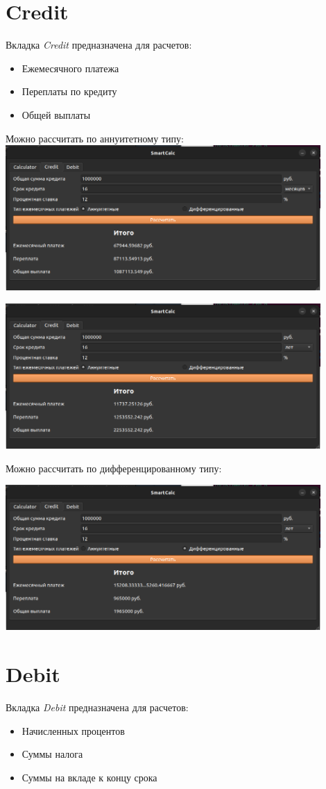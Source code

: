 \documentclass[12pt, letterpaper, twoside]{article}
\begin{document}
	\section{Credit}
	\begin{center}
		Вкладка \textit{Credit} предназначена для расчетов:
		\begin{itemize}
			\item Ежемесячного платежа
			\item Переплаты по кредиту
			\item Общей выплаты
		\end{itemize}
		
		\par Можно рассчитать по аннуитетному типу:
			\centering
			\includegraphics[width=12cm]{14}
		\par \includegraphics[width=12cm]{15}
		
		\par Можно рассчитать по дифференцированному типу:
			\centering
		\par \includegraphics[width=12cm]{16}
	\end{center}	

	\section{Debit}
		Вкладка \textit{Debit} предназначена для расчетов:
	\begin{itemize}
		\item Начисленных процентов
		\item Суммы налога
		\item Суммы на вкладе к концу срока
	\end{itemize}
	
\end{document}
